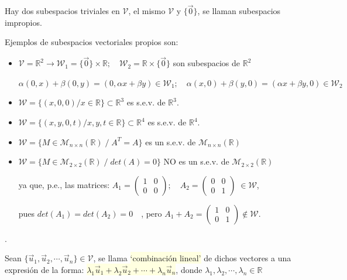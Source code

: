 \begin{ejem}
Hay dos subespacios triviales en $\mathcal V$, el mismo 	$\mathcal V$ y $\{\vec 0\}$, se llaman subespacios impropios.

Ejemplos de subespacios vectoriales propios son:

\begin{itemize}
\item $\mathcal V = \mathbb R^2 \to \mathcal W_1= \{\vec 0\} \times \mathbb R; \quad \mathcal W_2= \mathbb R \times \{\vec 0\}$ son subespacios de $\mathbb R^2$

\textcolor{gris}{ \footnotesize{$\alpha (0,x) + \beta (0,y)=(0,\alpha x + \beta y) \in \mathcal W_1 ; \quad 
\alpha (x,0) + \beta (y,0)=(\alpha x + \beta y,0) \in \mathcal W_2 $}}

\item $\mathcal W=\{ (x,0,0) / x \in \mathbb R \} \subset \mathbb R^3$ es s.e.v. de $\mathbb R^3$.
\item $\mathcal W=\{ (x,y,0,t) / x,y,t \in \mathbb R \} \subset \mathbb R^4$ es s.e.v. de $\mathbb R^4$.
\item $\mathcal W=\{ M\in \mathcal M_{n \times n}(\mathbb R) \; / \; A^T=A\}$ es un s.e.v. de $\mathcal M_{n \times n}(\mathbb R)$
\item $\mathcal W=\{ M\in \mathcal M_{2 \times 2}(\mathbb R) \; / \; det(A)=0\}$ NO es un s.e.v. de $\mathcal M_{2 \times 2}(\mathbb R)$

\vspace{2mm} \textcolor{gris}{\small{ya que, p.e., las matrices: 
$A_1=\left( \begin{matrix} 1&0\\0&0 \end{matrix} \right); \quad 
A_2=\left( \begin{matrix} 0&0\\0&1 \end{matrix} \right) \; \in \mathcal W$,}}
 
\textcolor{gris}{ \small{pues $det(A_1)=det(A_2)=0\quad $, pero $A_1+A_2= \left( \begin{matrix} 1&0\\0&1 \end{matrix} \right) \notin \mathcal W$}\normalsize{.}}
	
\end{itemize}
\end{ejem}

\begin{defi}.

Sean $\{ \vec u_1, \vec u_2, \cdots, \vec u_n \} \in \mathcal V$, se llama \colorbox{LightYellow}{`combinación lineal'} de dichos vectores a una expresión de la forma: 
\colorbox{LightYellow}{$\lambda_1 \vec u_1 + \lambda_2 \vec u_2 + \cdots +\lambda_n \vec u_n$},
 donde $\lambda_1, \lambda_2, \cdots, \lambda_n \in \mathbb R$
\end{defi}

